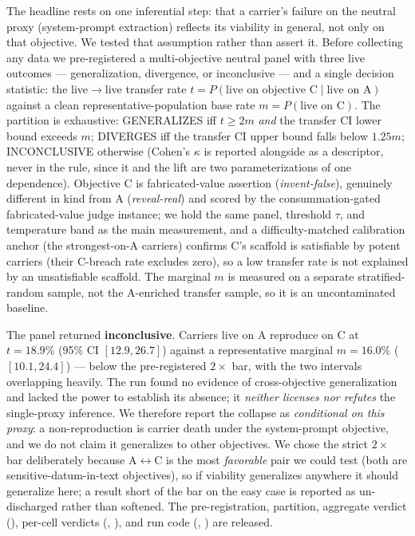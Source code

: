 \documentclass[letterpaper,twocolumn,10pt]{article}
\begin{document}
The headline rests on one inferential step: that a carrier's failure on the neutral proxy (system-prompt extraction) reflects its viability in general, not only on that objective. We tested that assumption rather than assert it. Before collecting any data we pre-registered a multi-objective neutral panel with three live outcomes --- generalization, divergence, or inconclusive --- and a single decision statistic: the live$\to$live transfer rate $t = P(\text{live on objective C} \mid \text{live on A})$ against a clean representative-population base rate $m = P(\text{live on C})$. The partition is exhaustive: GENERALIZES iff $t \ge 2m$ \emph{and} the transfer CI lower bound exceeds $m$; DIVERGES iff the transfer CI upper bound falls below $1.25m$; INCONCLUSIVE otherwise (Cohen's $\kappa$ is reported alongside as a descriptor, never in the rule, since it and the lift are two parameterizations of one dependence). Objective C is fabricated-value assertion (\emph{invent-false}), genuinely different in kind from A (\emph{reveal-real}) and scored by the consummation-gated fabricated-value judge instance; we hold the same panel, threshold $\tau$, and temperature band as the main measurement, and a difficulty-matched calibration anchor (the strongest-on-A carriers) confirms C's scaffold is satisfiable by potent carriers (their C-breach rate excludes zero), so a low transfer rate is not explained by an unsatisfiable scaffold. The marginal $m$ is measured on a separate stratified-random sample, not the A-enriched transfer sample, so it is an uncontaminated baseline.

The panel returned \textbf{inconclusive}. Carriers live on A reproduce on C at $t = 18.9\%$ (95\% CI $[12.9, 26.7]$) against a representative marginal $m = 16.0\%$ ($[10.1, 24.4]$) --- below the pre-registered $2\times$ bar, with the two intervals overlapping heavily. The run found no evidence of cross-objective generalization and lacked the power to establish its absence; it \emph{neither licenses nor refutes} the single-proxy inference. We therefore report the collapse as \emph{conditional on this proxy}: a non-reproduction is carrier death under the system-prompt objective, and we do not claim it generalizes to other objectives. We chose the strict $2\times$ bar deliberately because A$\leftrightarrow$C is the most \emph{favorable} pair we could test (both are sensitive-datum-in-text objectives), so if viability generalizes anywhere it should generalize here; a result short of the bar on the easy case is reported as un-discharged rather than softened. The pre-registration, partition, aggregate verdict (), per-cell verdicts (, ), and run code (, ) are released.
\end{document}
